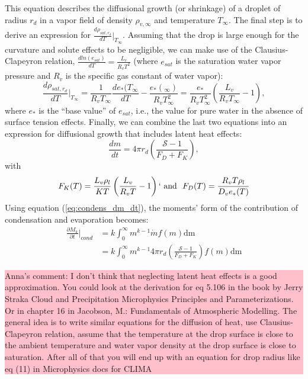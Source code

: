 \documentclass{report}
\begin{document}
This equation describes the diffusional growth (or shrinkage) of a droplet of radius $r_d$ in a vapor field of density $\rho_{v, \infty}$ and temperature $T_\infty$. The final step is to derive an expression for $\frac{d\rho_{sat, r_d}}{dT}\biggr\rvert_{T_{\infty}}$. Assuming that the drop is large enough for the curvature and solute effects to be negligible, we can make use of the Clausius-Clapeyron relation, $\frac{d ln(e_{sat})}{dT} = \frac{L_v}{R_v T^2}$ (where $e_{sat}$ is the saturation water vapor pressure and $R_v$ is the specific gas constant of water vapor):
\begin{equation}
    \frac{d\rho_{sat, r_d}}{dT}\biggr\rvert_{T_{\infty}} = \frac{1}{R_v T_\infty} \frac{d e_*(T_\infty}{dT} - \frac{e_*(_\infty)}{R_v T_\infty^2} = \frac{e_*}{R_v T_\infty^2} \left(\frac{L_v}{R_v T_\infty} - 1 \right),
\label{eq:claus_clap}
\end{equation}
where $e_*$ is the ``base value'' of $e_{sat}$, i.e., the value for pure water in the absence of surface tension effects. Finally, we can combine the last two equations into an expression for diffusional growth that includes latent heat effects:
\begin{equation}
    \frac{dm}{dt} = 4 \pi r_d \left(\frac{\mathcal{S} - 1}{F_D + F_K}\right), 
\end{equation}
with
\begin{equation}
    F_K(T) = \frac{L_v \rho_l}{K T} \left(\frac{L_v}{R_vT} - 1\right) `~\textrm{and} ~~ F_D(T) = \frac{R_v T \rho_l}{D_v e_*(T)}
\end{equation}
Using equation (\ref{eq:condens_dm_dt}), the moments' form of the contribution of condensation and evaporation becomes:
\begin{equation}
\begin{aligned}
    \frac{\partial M_k}{\partial t} \biggr\rvert_{cond} &= k\int_0^\infty m^{k-1}\dot{m}f(m) \text{dm} \\
                                                        &= k\int_0^\infty m^{k-1}4 \pi r_d \left(\frac{\mathcal{S} - 1}{F_D + F_K}\right)f(m) \text{dm}
\label{eq:condensation_moments}
\end{aligned}
\end{equation}
\noindent
\colorbox{pink}{\parbox{12cm}{Anna's comment: I don't think that neglecting latent heat effects is a good approximation. 
You could look at the derivation for eq 5.106 in the book by Jerry Straka Cloud and Precipitation 
Microphysics Principles and Parameterizations. Or in chapter 16 in Jacobson, M.: Fundamentals of Atmospheric Modelling. The general idea is to write similar equations for the diffusion of heat,
use Clausius-Clapeyron relation, assume that the temperature at the drop surface is close to the ambient temperature and water vapor density at the drop surface is close to saturation.
After all of that you will end up with an equation for drop radius like eq (11) in Microphysics
docs for CLIMA}}
\end{document}
